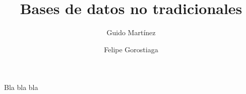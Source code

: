 \documentclass[fleqn,a4paper,9pt]{book}
\author{Guido Martínez \and Felipe Gorostiaga}
\title{Bases de datos no tradicionales}
\begin{document}
\maketitle



Bla bla bla
\end{document}

